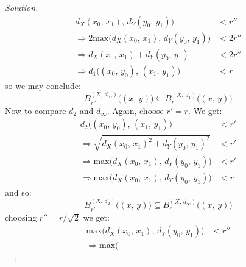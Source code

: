 \documentclass{article}
\theoremstyle{normal}
\begin{document}
\begin{proof}[Solution]
\begin{subequations}
\begin{align}
                    d_{X}(x_{0},\,x_{1}),\,d_{Y}(y_{0},\,y_{1})
                \big)&<r''\\
                \Rightarrow
                2\textrm{max}\big(%
                    d_{X}(x_{0},\,x_{1}),\,d_{Y}(y_{0},\,y_{1})
                \big)&<2r''\\
                \Rightarrow
                d_{X}(x_{0},\,x_{1})+d_{Y}(y_{0},\,y_{1})&<2r''\\
                \Rightarrow
                d_{1}\big((x_{0},\,y_{0}),\,(x_{1},\,y_{1})\big)&<r
            \end{align}
        \end{subequations}
        so we may conclude:
        \begin{equation}
            B_{r''}^{(X,\,d_{\infty})}\big((x,\,y)\big)\subseteq
                B_{r}^{(X,\,d_{1})}\big((x,\,y)\big)
        \end{equation}
        Now to compare $d_{2}$ and $d_{\infty}$. Again, choose
        $r'=r$. We get:
        \begin{subequations}
            \begin{align}
                d_{2}\big((x_{0},\,y_{0}),\,(x_{1},\,y_{1})\big)
                &<r'\\
                \Rightarrow
                \sqrt{d_{X}(x_{0},\,x_{1})^{2}+d_{Y}(y_{0},\,y_{1})^{2}}&<r'\\
                \Rightarrow
                \textrm{max}\big(%
                    d_{X}(x_{0},\,x_{1}),\,d_{Y}(y_{0},\,y_{1})
                \big)&<r'\\
                \Rightarrow
                \textrm{max}\big(%
                    d_{X}(x_{0},\,x_{1}),\,d_{Y}(y_{0},\,y_{1})
                \big)&<r
            \end{align}
        \end{subequations}
        and so:
        \begin{equation}
            B_{r'}^{(X,\,d_{2})}\big((x,\,y)\big)\subseteq
                B_{r}^{(X,\,d_{\infty})}\big((x,\,y)\big)
        \end{equation}
        choosing $r''=r/\sqrt{2}$ we get:
        \begin{subequations}
            \begin{align}
                \textrm{max}\big(%
                    d_{X}(x_{0},\,x_{1}),\,d_{Y}(y_{0},\,y_{1})
                \big)&<r''\\
                \Rightarrow
                \textrm{max}\big(%

\end{align}
\end{subequations}
\end{proof}
\end{document}
